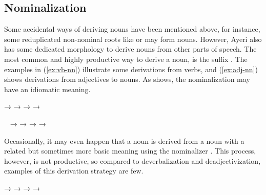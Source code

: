 \subsection{Nominalization}

Some accidental ways of deriving nouns have been mentioned above, for instance, 
some reduplicated non-nominal roots like  or 
 may form nouns. However, Ayeri also has some 
dedicated morphology to derive nouns from other parts of speech. The most common 
and highly productive way to derive a noun, is the suffix . 
The examples in (\ref{ex:vb-nn}) illustrate some derivations from verbs, and 
(\ref{ex:adj-nn}) shows derivations from adjectives to nouns. As 
 shows, the nominalization may have an idiomatic 
meaning.

\pex\label{ex:vb-nn}
	\a {}
		→ 
	\a {}
		→ 
	\a {}
		→ 
	\a {}
		→ 
\xe

\pex~\label{ex:adj-nn}
	\a {}
		→ 
	\a {}
		→ 
	\a {}
		→ 
	\a {}
		→ 
\xe

Occasionally, it may even happen that a noun is derived from a noun with a 
related but sometimes more basic meaning using the nominalizer . 
This process, however, is not productive, so compared to deverbalization and 
deadjectivization, examples of this derivation strategy are few.

\pex\label{ex:nn-nn}
	\a {}
		→ 
	\a {}
		→ 
	\a {}
		→ 
	\a {}
		→ 
\xe

